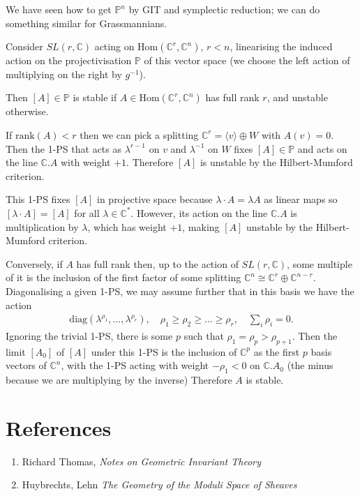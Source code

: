 \documentclass[12pt]{article}
\begin{document}
\begin{example}
    We have seen how to get $\mathbb{P}^n$ by GIT and symplectic reduction; we can do something similar for Grassmannians.
    
    Consider $SL(r, \mathbb{C})$ acting on $\text{Hom}(\mathbb{C}^r, \mathbb{C}^n)$, $r < n$, linearising the induced action on the projectivisation $\mathbb{P}$ of this vector space (we choose the left action of multiplying on the right by $g^{-1}$).
    

Then $[A] \in \mathbb{P}$ is stable if $A \in \text{Hom}(\mathbb{C}^r, \mathbb{C}^n)$ has full rank $r$, and unstable otherwise.

    If $\text{rank}(A) < r$ then we can pick a splitting $\mathbb{C}^r = \langle v \rangle \oplus W$ with $A(v) = 0$. Then the 1-PS that acts as $\lambda^{r-1}$ on $v$ and $\lambda^{-1}$ on $W$ fixes $[A] \in \mathbb{P}$ and acts on the line $\mathbb{C}.A$ with weight $+1$. Therefore $[A]$ is unstable by the Hilbert-Mumford criterion.
    
This 1-PS fixes $[A]$ in projective space because $\lambda \cdot A = \lambda A$ as linear maps so $[\lambda \cdot A] = [A]$ for all $\lambda \in \mathbb{C}^*$. However, its action on the line $\mathbb{C}.A$ is multiplication by $\lambda$, which has weight $+1$, making $[A]$ unstable by the Hilbert-Mumford criterion.

Conversely, if $A$ has full rank then, up to the action of $SL(r, \mathbb{C})$, some multiple of it is the inclusion of the first factor of some splitting $\mathbb{C}^n \cong \mathbb{C}^r \oplus \mathbb{C}^{n-r}$. Diagonalising a given 1-PS, we may assume further that in this basis we have the action
\begin{align*}
\text{diag}(\lambda^{\rho_1}, \ldots, \lambda^{\rho_r}), \quad \rho_1 \geq \rho_2 \geq \ldots \geq \rho_r, \quad \sum_i \rho_i = 0.
\end{align*}
Ignoring the trivial 1-PS, there is some $p$ such that $\rho_1 = \rho_p > \rho_{p+1}$. Then the limit $[A_0]$ of $[A]$ under this 1-PS is the inclusion of $\mathbb{C}^p$ as the first $p$ basis vectors of $\mathbb{C}^n$, with the 1-PS acting with weight $-\rho_1 < 0$ on $\mathbb{C}.A_0$ (the minus because we are multiplying by the inverse) Therefore $A$ is stable. 
\end{example}

\section{References}
\begin{enumerate}
    \item Richard Thomas, \textit{Notes on Geometric Invariant Theory}
    \item Huybrechts, Lehn \textit{The Geometry of the Moduli Space of Sheaves}
    
\end{enumerate}
\end{document}
